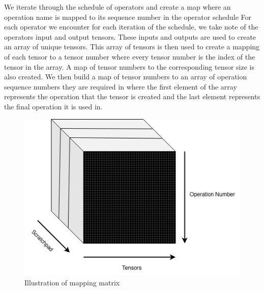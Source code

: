 



We iterate through the schedule of operators and create a map where an
operation name is mapped to its sequence number in the operator schedule
For each operator we encounter for each iteration
of the schedule, we take note of the operators input and output tensors. These inputs
and outputs are used to create an array of unique tensors. This array of
tensors is then used to create a mapping of each tensor to a tensor number
where every tensor number is the index of the tensor in the array. A map of 
tensor numbers to the corresponding tensor size is also created. We then
build a map of tensor numbers to an array of operation sequence numbers they are
required in where the first element of the array represents the operation that
the tensor is created and the last element represents the final operation
it is used in.




\begin{figure}[thb!]
\centering
\includegraphics[scale=0.7]{Figures/mapping_matrix_cube.png}
\decoRule
\caption[3D Tensor Mapping Matrix]{Illustration of mapping matrix}
\label{fig:mappingCube}
\end{figure}


